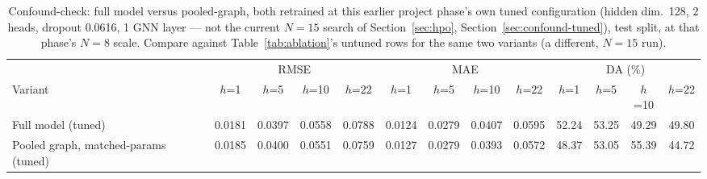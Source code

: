\documentclass[journal]{IEEEtran}
\begin{document}
\begin{table}[!t]
\centering
\caption{Confound-check: full model versus pooled-graph, both retrained at this earlier project phase's own tuned configuration (hidden dim.\ 128, 2 heads, dropout 0.0616, 1 GNN layer --- not the current $N=15$ search of Section~\ref{sec:hpo}, Section~\ref{sec:confound-tuned}), test split, at that phase's $N=8$ scale. Compare against Table~\ref{tab:ablation}'s untuned rows for the same two variants (a different, $N=15$ run).}
\label{tab:confound-tuned}
\begin{tabular}{l cccc cccc cccc}
\toprule
& \multicolumn{4}{c}{RMSE} & \multicolumn{4}{c}{MAE} & \multicolumn{4}{c}{DA (\%)} \\
\cmidrule(lr){2-5} \cmidrule(lr){6-9} \cmidrule(lr){10-13}
Variant & $h$=1 & $h$=5 & $h$=10 & $h$=22 & $h$=1 & $h$=5 & $h$=10 & $h$=22 & $h$=1 & $h$=5 & $h$=10 & $h$=22 \\
\midrule
Full model (tuned) & 0.0181 & 0.0397 & 0.0558 & 0.0788 & 0.0124 & 0.0279 & 0.0407 & 0.0595 & 52.24 & 53.25 & 49.29 & 49.80 \\
Pooled graph, matched-params (tuned) & 0.0185 & 0.0400 & 0.0551 & 0.0759 & 0.0127 & 0.0279 & 0.0393 & 0.0572 & 48.37 & 53.05 & 55.39 & 44.72 \\
\bottomrule
\end{tabular}
\end{table}
\end{document}
